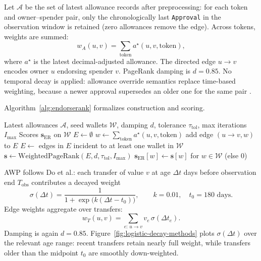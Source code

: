 
Let $\mathcal{A}$ be the set of latest allowance records after preprocessing: for each token and owner--spender pair, only the chronologically last \texttt{Approval} in the observation window is retained (zero allowances remove the edge). Across tokens, weights are summed:
\begin{equation}
\label{eq:approve-weight}
w_A(u,v)
=
\sum_{\mathrm{token}}
a^{\star}(u,v,\mathrm{token}),
\end{equation}
where $a^{\star}$ is the latest decimal-adjusted allowance. The directed edge $u\to v$ encodes owner $u$ endorsing spender $v$. PageRank damping is $d=0.85$. No temporal decay is applied: allowance override semantics replace time-based weighting, because a newer approval supersedes an older one for the same pair .

Algorithm~\ref{alg:endorserank} formalizes construction and scoring.

\begin{algorithm}[htbp]
\caption{EndorseRank graph construction and scoring}
\label{alg:endorserank}
\begin{algorithmic}[1]
\Require Latest allowances $\mathcal{A}$, seed wallets $\mathcal{W}$, damping $d$, tolerance $\tau_{\mathrm{tol}}$, max iterations $I_{\max}$
\Ensure Scores $\mathbf{s}_{\mathrm{ER}}$ on $\mathcal{W}$
\State $E \gets \emptyset$
  \State $w \gets \sum_{\mathrm{token}} a^{\star}(u,v,\mathrm{token})$
    \State add edge $(u\to v, w)$ to $E$
  \EndIf
\EndFor
\State $E \gets$ edges in $E$ incident to at least one wallet in $\mathcal{W}$
\State $\mathbf{s} \gets \mathrm{WeightedPageRank}(E, d, \tau_{\mathrm{tol}}, I_{\max})$
\State \Return $\mathbf{s}_{\mathrm{ER}}[w] \gets \mathbf{s}[w]$ for $w\in\mathcal{W}$ (else $0$)
\end{algorithmic}
\end{algorithm}


AWP follows Do et al.: each transfer of value $v$ at age $\Delta t$ days before observation end $T_{\mathrm{obs}}$ contributes a decayed weight
\begin{equation}
\label{eq:logistic-decay}
\sigma(\Delta t)
=
\frac{1}{1+\exp\bigl(k(\Delta t-t_0)\bigr)},
\qquad
k=0.01,\quad t_0=180\text{ days}.
\end{equation}
Edge weights aggregate over transfers:
\begin{equation}
\label{eq:transfer-weight}
w_T(u,v)
=
\sum_{e:\,u\to v}
v_e\,\sigma(\Delta t_e).
\end{equation}
Damping is again $d=0.85$. Figure~\ref{fig:logistic-decay-methods} plots $\sigma(\Delta t)$ over the relevant age range: recent transfers retain nearly full weight, while transfers older than the midpoint $t_0$ are smoothly down-weighted.

